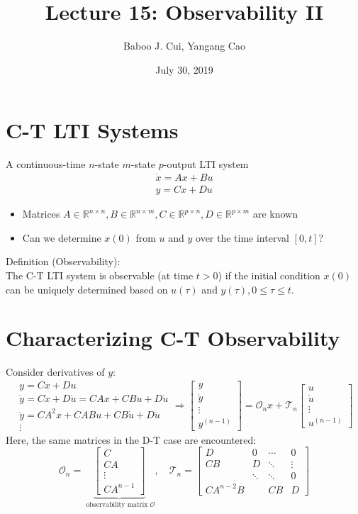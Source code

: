 \documentclass[10pt,a4paper,oneside]{article}
\date{July 30, 2019}
\author{Baboo J. Cui, Yangang Cao}
\title{Lecture 15: Observability II}
\begin{document}
\maketitle
\tableofcontents
\newpage
\section{C-T LTI Systems}
A continuous-time $n$-state $m$-state $p$-output LTI system
\[
\begin{array}{l}{\dot{x}=A x+B u} \\ {y=C x+D u}\end{array}
\]
\begin{itemize}
\item Matrices $A \in \mathbb{R}^{n \times n}, B \in \mathbb{R}^{n \times m}, C \in \mathbb{R}^{p \times n}, D \in \mathbb{R}^{p \times m}$ are known
\item Can we determine $x(0)$ from $u$ and $y$ over the time interval $[0, t] ?$
\end{itemize}
Definition (Observability):\\
The C-T LTI system is observable (at time $t>0$) if the initial condition
$x(0)$ can be uniquely determined based on $u(\tau)$ and $y(\tau), 0 \leq \tau \leq t$.
\section{Characterizing C-T Observability}
Consider derivatives of $y$:
\[
\begin{array}{l}{y=C x+D u} \\ {\dot{y}=C \dot{x}+D \dot{u}=C A x+C B u+D \dot{u}} \\ {\ddot{y}=C A^{2} x+C A B u+C B \dot{u}+D \ddot{u}}\\{\vdots}\end{array} \Rightarrow\left[\begin{array}{c}{y} \\ {\dot{y}} \\ {\vdots} \\ {y^{(n-1)}}\end{array}\right]=\mathcal{O}_{n}x+\mathcal{T}_{n}\left[\begin{array}{c}{u} \\ {\dot{u}} \\ {\vdots} \\ {u^{(n-1)}}\end{array}\right]
\]
Here, the same matrices in the D-T case are encountered:
\[
\mathcal{O}_{n}=\underbrace{\left[\begin{array}{c}{C} \\ {C A} \\ {\vdots} \\ {C A^{n-1}}\end{array}\right]}_{\text { observability matrix } \mathcal{O}}, \quad \mathcal{T}_{n}=\left[\begin{array}{cccc}{D} & {0} & {\cdots} & {0} \\ {C B} & {D} & {\ddots} & {\vdots} \\ {} & {\ddots} & {\ddots} & {0} \\ {C A^{n-2} B} & {} & {C B} & {D}\end{array}\right]
\]
\end{document}
